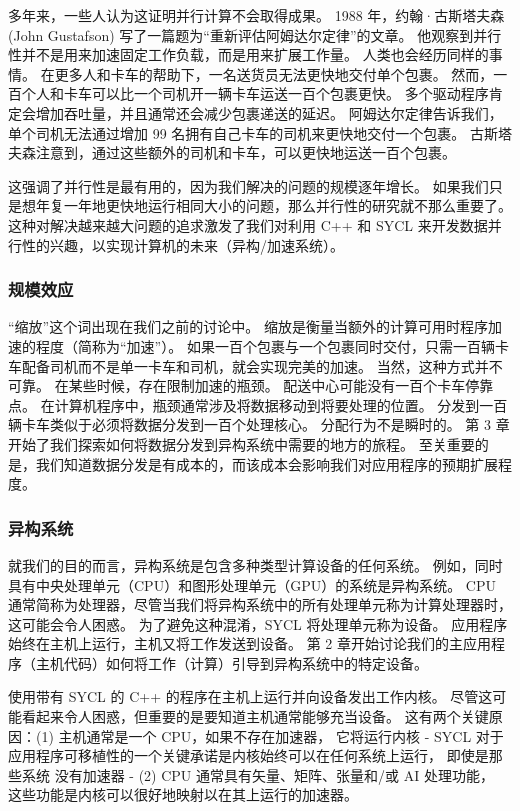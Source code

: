 多年来，一些人认为这证明并行计算不会取得成果。 
1988 年，约翰·古斯塔夫森 (John Gustafson) 写了一篇题为“重新评估阿姆达尔定律”的文章。 
他观察到并行性并不是用来加速固定工作负载，而是用来扩展工作量。 人类也会经历同样的事情。 
在更多人和卡车的帮助下，一名送货员无法更快地交付单个包裹。 
然而，一百个人和卡车可以比一个司机开一辆卡车运送一百个包裹更快。 
多个驱动程序肯定会增加吞吐量，并且通常还会减少包裹递送的延迟。 
阿姆达尔定律告诉我们，单个司机无法通过增加 99 名拥有自己卡车的司机来更快地交付一个包裹。 
古斯塔夫森注意到，通过这些额外的司机和卡车，可以更快地运送一百个包裹。

这强调了并行性是最有用的，因为我们解决的问题的规模逐年增长。 
如果我们只是想年复一年地更快地运行相同大小的问题，那么并行性的研究就不那么重要了。 
这种对解决越来越大问题的追求激发了我们对利用 C++ 和 SYCL 来开发数据并行性的兴趣，以实现计算机的未来（异构/加速系统）。

\subsubsection{规模效应}
“缩放”这个词出现在我们之前的讨论中。 缩放是衡量当额外的计算可用时程序加速的程度（简称为“加速”）。 
如果一百个包裹与一个包裹同时交付，只需一百辆卡车配备司机而不是单一卡车和司机，就会实现完美的加速。 
当然，这种方式并不可靠。 在某些时候，存在限制加速的瓶颈。 配送中心可能没有一百个卡车停靠点。 
在计算机程序中，瓶颈通常涉及将数据移动到将要处理的位置。 分发到一百辆卡车类似于必须将数据分发到一百个处理核心。 
分配行为不是瞬时的。 第 3 章开始了我们探索如何将数据分发到异构系统中需要的地方的旅程。 
至关重要的是，我们知道数据分发是有成本的，而该成本会影响我们对应用程序的预期扩展程度。

\subsubsection{异构系统}
就我们的目的而言，异构系统是包含多种类型计算设备的任何系统。 
例如，同时具有中央处理单元（CPU）和图形处理单元（GPU）的系统是异构系统。 
CPU 通常简称为处理器，尽管当我们将异构系统中的所有处理单元称为计算处理器时，这可能会令人困惑。 
为了避免这种混淆，SYCL 将处理单元称为设备。 应用程序始终在主机上运行，主机又将工作发送到设备。 
第 2 章开始讨论我们的主应用程序（主机代码）如何将工作（计算）引导到异构系统中的特定设备。

使用带有 SYCL 的 C++ 的程序在主机上运行并向设备发出工作内核。 
尽管这可能看起来令人困惑，但重要的是要知道主机通常能够充当设备。 
这有两个关键原因：(1) 主机通常是一个 CPU，如果不存在加速器，
它将运行内核 - SYCL 对于应用程序可移植性的一个关键承诺是内核始终可以在任何系统上运行，
即使是那些系统 没有加速器 - (2) CPU 通常具有矢量、矩阵、张量和/或 AI 处理功能，
这些功能是内核可以很好地映射以在其上运行的加速器。


